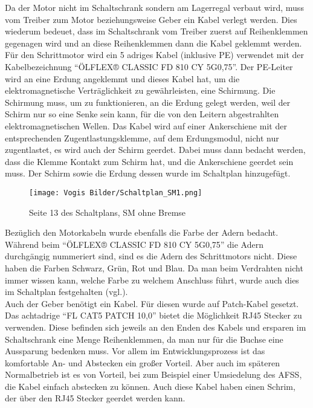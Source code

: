     Da der Motor nicht im Schaltschrank sondern am Lagerregal verbaut wird, muss vom Treiber zum Motor beziehungsweise Geber ein Kabel verlegt werden. Dies wiederum bedeuet, dass im Schaltschrank vom Treiber zuerst auf Reihenklemmen gegenagen wird und an diese Reihenklemmen dann die Kabel geklemmt werden. Für den Schrittmotor wird ein 5 adriges Kabel (inklusive PE) verwendet mit der Kabelbezeichnung \enquote{ÖLFLEX® CLASSIC FD 810 CY 5G0,75}. Der PE-Leiter wird an eine Erdung angeklemmt und dieses Kabel hat, um die elektromagnetische Verträglichkeit zu gewährleisten, eine Schirmung. Die Schirmung muss, um zu funktionieren, an die Erdung gelegt werden, weil der Schirm nur so eine Senke sein kann, für die von den Leitern abgestrahlten elektromagnetischen Wellen. Das Kabel wird auf einer Ankerschiene mit der entsprechenden Zugentlastungsklemme, auf dem Erdungsmodul, nicht nur zugentlastet, es wird auch der Schirm geerdet. Dabei muss dann bedacht werden, dass die Klemme Kontakt zum Schirm hat, und die Ankerschiene geerdet sein muss. Der Schirm sowie die Erdung dessen wurde im Schaltplan hinzugefügt.\\    
    \begin{figure}[h]
        \centering
        \texttt{[image: Vogis Bilder/Schaltplan\_SM1.png]}
        \caption{Seite 13 des Schaltplans, SM ohne Bremse}
        \label{fig:SMohneBremse}
    \end{figure}
    Bezüglich den Motorkabeln wurde ebenfalls die Farbe der Adern bedacht. Während beim \enquote{ÖLFLEX® CLASSIC FD 810 CY 5G0,75} die Adern durchgängig nummeriert sind, sind es die Adern des Schrittmotors nicht. Diese haben die Farben Schwarz, Grün, Rot und Blau. Da man beim Verdrahten nicht immer wissen kann, welche Farbe zu welchem Anschluss führt, wurde auch dies im Schaltplan festgehalten (vgl.\cite{Nema_SM_Kontaktbezeichnung}).\\
    Auch der Geber benötigt ein Kabel. Für diesen wurde auf Patch-Kabel gesetzt. Das achtadrige \enquote{FL CAT5 PATCH 10,0} bietet die Möglichkeit RJ45 Stecker zu verwenden. Diese befinden sich jeweils an den Enden des Kabels und ersparen im Schaltschrank eine Menge Reihenklemmen, da man nur für die Buchse eine Aussparung bedenken muss. Vor allem im Entwicklungsprozess ist das komfortable An- und Abstecken ein großer Vorteil. Aber auch im späteren Normalbetrieb ist es von Vorteil, bei zum Beispiel einer Umsiedelung des AFSS, die Kabel einfach abstecken zu können. Auch diese Kabel haben einen Schrim, der über den RJ45 Stecker geerdet werden kann.\\\\

